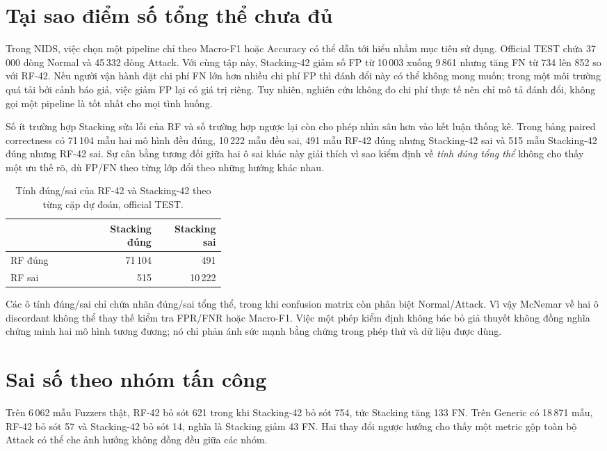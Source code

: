 


\section{Tại sao điểm số tổng thể chưa đủ}
Trong NIDS, việc chọn một pipeline chỉ theo Macro-F1 hoặc Accuracy có thể dẫn tới hiểu nhầm mục tiêu sử dụng. Official TEST chứa 37\,000 dòng Normal và 45\,332 dòng Attack. Với cùng tập này, Stacking-42 giảm số FP từ 10\,003 xuống 9\,861 nhưng tăng FN từ 734 lên 852 so với RF-42. Nếu người vận hành đặt chi phí FN lớn hơn nhiều chi phí FP thì đánh đổi này có thể không mong muốn; trong một môi trường quá tải bởi cảnh báo giả, việc giảm FP lại có giá trị riêng. Tuy nhiên, nghiên cứu không đo chi phí thực tế nên chỉ mô tả đánh đổi, không gọi một pipeline là tốt nhất cho mọi tình huống.

Số ít trường hợp Stacking sửa lỗi của RF và số trường hợp ngược lại còn cho phép nhìn sâu hơn vào kết luận thống kê. Trong bảng paired correctness có 71\,104 mẫu hai mô hình đều đúng, 10\,222 mẫu đều sai, 491 mẫu RF-42 đúng nhưng Stacking-42 sai và 515 mẫu Stacking-42 đúng nhưng RF-42 sai. Sự cân bằng tương đối giữa hai ô sai khác này giải thích vì sao kiểm định về \emph{tính đúng tổng thể} không cho thấy một ưu thế rõ, dù FP/FN theo từng lớp đổi theo những hướng khác nhau.

\begin{table}[htbp]\centering
\caption{Tính đúng/sai của RF-42 và Stacking-42 theo từng cặp dự đoán, official TEST.}
\label{tab:paired-correctness}
\begin{tabular}{p{0.36\linewidth}rr}\toprule
 & Stacking đúng & Stacking sai\\\midrule
RF đúng & 71\,104 & 491\\
RF sai & 515 & 10\,222\\\bottomrule
\end{tabular}
\end{table}

Các ô tính đúng/sai chỉ chứa nhãn đúng/sai tổng thể, trong khi confusion matrix còn phân biệt Normal/Attack. Vì vậy McNemar về hai ô discordant không thể thay thế kiểm tra FPR/FNR hoặc Macro-F1. Việc một phép kiểm định không bác bỏ giả thuyết không đồng nghĩa chứng minh hai mô hình tương đương; nó chỉ phản ánh sức mạnh bằng chứng trong phép thử và dữ liệu được dùng.

\section{Sai số theo nhóm tấn công}
Trên 6\,062 mẫu Fuzzers thật, RF-42 bỏ sót 621 trong khi Stacking-42 bỏ sót 754, tức Stacking tăng 133 FN. Trên Generic có 18\,871 mẫu, RF-42 bỏ sót 57 và Stacking-42 bỏ sót 14, nghĩa là Stacking giảm 43 FN. Hai thay đổi ngược hướng cho thấy một metric gộp toàn bộ Attack có thể che ảnh hưởng không đồng đều giữa các nhóm.

